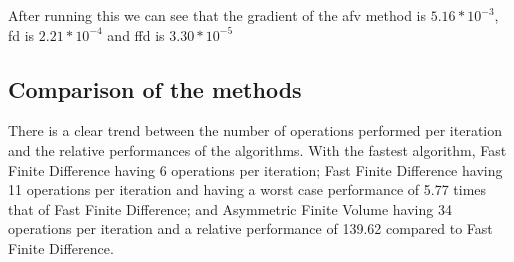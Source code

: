 \documentclass[aps,twocolumn,pre,nofootinbib,10pt]{revtex4-1}
\begin{document}
After running this we can see that the gradient of the afv method is $5.16*10^{-3}$, fd is $2.21*10^{-4}$ and ffd is $3.30*10^{-5}$

\subsection{Comparison of the methods}

There is a clear trend between the number of operations performed per iteration and the relative performances of the algorithms. With the fastest algorithm, Fast Finite Difference having 6 operations per iteration; Fast Finite Difference having 11 operations per iteration and having a worst case performance of 5.77 times that of Fast Finite Difference; and Asymmetric Finite Volume having 34 operations per iteration and a relative performance of 139.62 compared to Fast
Finite Difference. 
\end{document}

